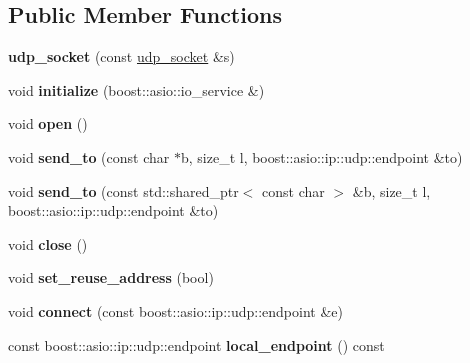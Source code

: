 \subsection*{Public Member Functions}
\begin{DoxyCompactItemize}
\item 
\mbox{\label{classfc_1_1udp__socket_a9ff80cf2ec65a3c887f8e00e79cf8f98}} 
{\bfseries udp\+\_\+socket} (const \mbox{\hyperlink{classfc_1_1udp__socket}{udp\+\_\+socket}} \&s)
\item 
\mbox{\label{classfc_1_1udp__socket_ad9f0cf8cf36cf5948be0fc7f3664fd28}} 
void {\bfseries initialize} (boost\+::asio\+::io\+\_\+service \&)
\item 
\mbox{\label{classfc_1_1udp__socket_ae38731361b74a2841f4691066ac31d86}} 
void {\bfseries open} ()
\item 
\mbox{\label{classfc_1_1udp__socket_a99f7b46a3566de47d7977ce10b674fe1}} 
void {\bfseries send\+\_\+to} (const char $\ast$b, size\+\_\+t l, boost\+::asio\+::ip\+::udp\+::endpoint \&to)
\item 
\mbox{\label{classfc_1_1udp__socket_a0f8d1dde4527e6e5c128601586160a53}} 
void {\bfseries send\+\_\+to} (const std\+::shared\+\_\+ptr$<$ const char $>$ \&b, size\+\_\+t l, boost\+::asio\+::ip\+::udp\+::endpoint \&to)
\item 
\mbox{\label{classfc_1_1udp__socket_a7be64e6fda2524b07192ca354559bbcd}} 
void {\bfseries close} ()
\item 
\mbox{\label{classfc_1_1udp__socket_a65856d35d2beda8da40ab9f916705f21}} 
void {\bfseries set\+\_\+reuse\+\_\+address} (bool)
\item 
\mbox{\label{classfc_1_1udp__socket_acd2fec7ae0595eb52ec1241998ac90ed}} 
void {\bfseries connect} (const boost\+::asio\+::ip\+::udp\+::endpoint \&e)
\item 
\mbox{\label{classfc_1_1udp__socket_a315ceb1d2edbec581dbffe676784ff05}} 
const boost\+::asio\+::ip\+::udp\+::endpoint {\bfseries local\+\_\+endpoint} () const
\end{DoxyCompactItemize}


